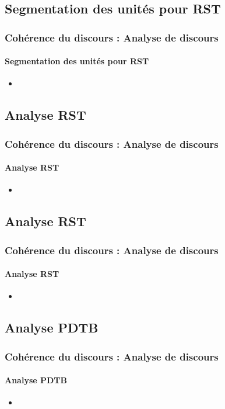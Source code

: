 \documentclass[xcolor=table]{beamer}
\begin{document}
\subsection{Segmentation des unités pour RST}

\begin{frame}
	\frametitle{Cohérence du discours : Analyse de discours}
	\framesubtitle{Segmentation des unités pour RST}
	
	\begin{itemize}
		\item 
	\end{itemize}
	
\end{frame}

\subsection{Analyse RST}

\begin{frame}
	\frametitle{Cohérence du discours : Analyse de discours}
	\framesubtitle{Analyse RST}
	
	\begin{itemize}
		\item 
	\end{itemize}
	
\end{frame}


\subsection{Analyse RST}

\begin{frame}
	\frametitle{Cohérence du discours : Analyse de discours}
	\framesubtitle{Analyse RST}
	
	\begin{itemize}
		\item 
	\end{itemize}
	
\end{frame}

\subsection{Analyse PDTB}

\begin{frame}
	\frametitle{Cohérence du discours : Analyse de discours}
	\framesubtitle{Analyse PDTB}
	
	\begin{itemize}
		\item 
	\end{itemize}
	
\end{frame}


\end{document}
